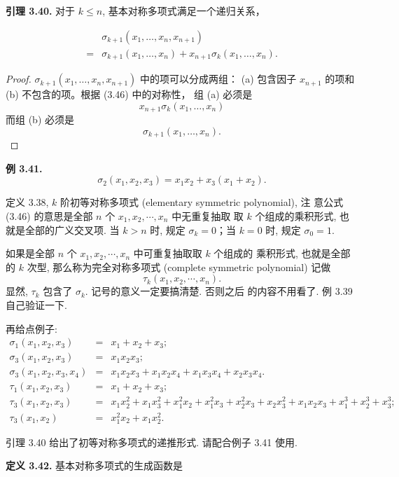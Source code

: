\documentclass[a4paper]{ctexart}
\begin{document}
{\noindent \textbf{引理 3.40.} 对于 $k \leq n$, 基本对称多项式满足一个递归关系，

\begin{align*}
&\sigma_{k+1}(x_1, \ldots, x_n, x_{n+1}) \\
=& \sigma_{k+1}(x_1, \ldots, x_n) + x_{n+1} \sigma_k(x_1, \ldots, x_n). 
\tag{3.48}
\end{align*}

\begin{proof}
$\sigma_{k+1}(x_{1}, \ldots, x_{n}, x_{n+1})$ 中的项可以分成两组：
(a) 包含因子 $x_{n+1}$ 的项和 (b) 不包含的项。根据 (3.46) 中的对称性，
组 (a) 必须是 
$$
x_{n+1} \sigma_{k}(x_{1}, \ldots, x_{n})
$$ 
而组 (b) 必须是 
$$
\sigma_{k+1}(x_{1}, \ldots, x_{n}).
$$
\end{proof} 

\noindent \textbf{例 3.41.} 
$$
\sigma_2(x_1, x_2, x_3) = x_1 x_2 + x_3(x_1 + x_2).
$$

定义 3.38, $k$ 阶初等对称多项式 (elementary symmetric polynomial), 注
意公式(3.46) 的意思是全部 $n$ 个 $x_1, x_2, \cdots, x_n$ 中无重复抽取
取 $k$ 个组成的乘积形式, 也就是全部的广义交叉项. 当 $k > n$ 时,
规定 $\sigma_k = 0$；当 $k = 0$ 时, 规定 $\sigma_0 = 1$.

如果是全部 $n$ 个 $x_1, x_2, \cdots, x_n$ 中可重复抽取取 $k$ 个组成的
乘积形式, 也就是全部的 $k$ 次型, 那么称为完全对称多项式 (complete
symmetric polynomial) 记做
$$
\tau_k(x_1, x_2, \cdots, x_n).
$$
显然, $\tau_k$ 包含了 $\sigma_k$. 记号的意义一定要搞清楚. 否则之后
的内容不用看了. 例 3.39 自己验证一下.

再给点例子:
$$
\begin{array}{rcl}
  \sigma_1(x_1, x_2, x_3) &=& x_1 + x_2 + x_3; \\
  \sigma_3(x_1, x_2, x_3) &=& x_1x_2x_3; \\
  \sigma_3(x_1, x_2, x_3, x_4) &=& x_1x_2x_3 + x_1x_2x_4 + x_1x_3x_4 + x_2x_3x_4.\\
  \tau_1(x_1, x_2, x_3) &=& x_1 + x_2 + x_3;\\
  \tau_3(x_1, x_2, x_3) &=& x_1x_2^2 + x_1x_3^2 + x_1^2x_2 + x_1^2x_3 + x_2^2x_3 + x_2x_3^2 + x_1x_2x_3 + x_1^3 + x_2^3 + x_3^3;\\
  \tau_3(x_1, x_2) &=& x_1^2x_2 + x_1x_2^2.
\end{array}
$$



引理 3.40 给出了初等对称多项式的递推形式. 请配合例子 3.41 使用.

\noindent \textbf{定义 3.42.} 基本对称多项式的生成函数是

}
\end{document}

